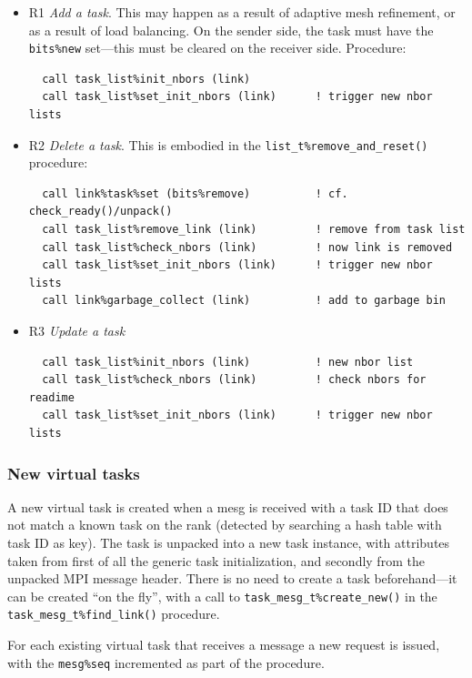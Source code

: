 \documentclass[paper=a4,fontsize=11pt]{scrartcl}
\numberwithin{equation}{section}		%
\numberwithin{figure}{section}			%
\numberwithin{table}{section}				%
\newcommand{\codecolor}{\color{Blue}}
\newcommand{\Code}[1]{{\codecolor\texttt{#1}}}
\begin{document}
\begin{itemize}
    \item{R1} \textit{Add a task}. This may happen as a result of adaptive mesh refinement, or as a result of load balancing.  On the sender side, the task must have the \Code{bits\%new} set---this must be cleared on the receiver side. Procedure:
{\codecolor\begin{verbatim}
  call task_list%init_nbors (link)
  call task_list%set_init_nbors (link)      ! trigger new nbor lists
\end{verbatim}}
    \item{R2} \textit{Delete a task}. This is embodied in the \Code{list\_t\%remove\_and\_reset()} procedure:
{\codecolor\begin{verbatim}
  call link%task%set (bits%remove)          ! cf. check_ready()/unpack()
  call task_list%remove_link (link)         ! remove from task list
  call task_list%check_nbors (link)         ! now link is removed
  call task_list%set_init_nbors (link)      ! trigger new nbor lists
  call link%garbage_collect (link)          ! add to garbage bin
\end{verbatim}}
    \item{R3} \textit{Update a task}
{\codecolor\begin{verbatim}
  call task_list%init_nbors (link)          ! new nbor list
  call task_list%check_nbors (link)         ! check nbors for readime
  call task_list%set_init_nbors (link)      ! trigger new nbor lists
\end{verbatim}}
\end{itemize}

\subsubsection{New virtual tasks}
A new virtual task is created when a mesg is received with a task ID that does not match a known task on the rank (detected by searching a hash table with task ID as key).  The task is unpacked into a new task instance, with attributes taken from first of all the generic task initialization, and secondly from the unpacked MPI message header.  There is no need to create a task beforehand---it can be created ``on the fly'', with a call to \Code{task\_mesg\_t\%create\_new()} in the \Code{task\_mesg\_t\%find\_link()} procedure.

For each existing virtual task that receives a message a new request is issued, with the \Code{mesg\%seq} incremented as part of the procedure.
\end{document}
